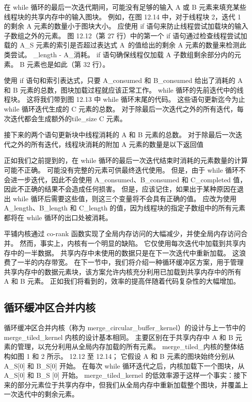 在 while 循环的最后一次迭代期间，可能没有足够的输入 $\mathrm{A}$ 或 B 元素来填充某些线程块的共享内存中的输入图块。 例如，在图 12.14 中，对于线程块 2，迭代 1 的剩余 A 元素的数量小于图块大小。 应使用 if 语句来防止线程尝试加载块的输入子数组之外的元素。 图 12.12（第 27 行）中的第一个 if 语句通过检查线程尝试加载的 A\_S 元素的索引是否超过表达式 A\ 的值给出的剩余 A 元素的数量来检测此类尝试。 \_length - A\_消耗。 if 语句确保线程仅加载 A 子数组剩余部分内的元素。 B 元素也是如此（第 32 行）。

使用 if 语句和索引表达式，只要 A\_consumed 和 B\_consumed 给出了消耗的 $\mathrm{A}$ 和 $\mathrm{B}$ 元素的总数，图块加载过程就应该正常工作。 while 循环的先前迭代中的线程块。 这将我们带到图 12.13 中 while 循环末尾的代码。 这些语句更新迄今为止 while 循环迭代生成的 $\mathrm{C}$ 元素的总数。 对于除最后一次迭代之外的所有迭代，每次迭代都会生成额外的tile\_size C 元素。

接下来的两个语句更新块中线程消耗的 A 和 B 元素的总数。 对于除最后一次迭代之外的所有迭代，线程块消耗的附加 A 元素的数量是以下返回值


正如我们之前提到的，在 while 循环的最后一次迭代结束时消耗的元素数量的计算可能不正确。 可能没有完整的元素可供最终迭代使用。 但是，由于 while 循环不会进一步迭代，因此不会使用 A\_consumed、B\_consumed 和 C\_completed 值，因此不正确的结果不会造成任何损害。 但是，应该记住，如果出于某种原因在退出 while 循环后需要这些值，则这三个变量将不会具有正确的值。 应改为使用 A\_length、B\_length 和 C\_length 的值，因为线程块的指定子数组中的所有元素都将在 while 循环的出口处被消耗。

平铺内核通过 co-rank 函数实现了全局内存访问的大幅减少，并使全局内存访问合并。 然而，事实上，内核有一个明显的缺陷。 它仅使用每次迭代中加载到共享内存中的一半数据。 共享内存中未使用的数据只是在下一次迭代中重新加载。 这浪费了一半的内存带宽。 在下一节中，我们将介绍一种循环缓冲区方案，用于管理共享内存中的数据元素块，该方案允许内核充分利用已加载到共享内存中的所有 A 和 B 元素。 正如我们将看到的，效率的提高伴随着代码复杂性的大幅增加。

\subsection{循环缓冲区合并内核}
循环缓冲区合并内核（称为 merge\_circular\_buffer\_kernel）的设计与上一节中的 merge\_tiled\_kernel 内核的设计基本相同。 主要区别在于共享内存中 $\mathrm{A}$ 和 $\mathrm{B}$ 元素的管理，以充分利用从全局内存加载的所有元素。 merge\_tiled\_内核的整体结构如图 1 和 2 所示。 12.12 至 12.14； 它假设 A 和 B 元素的图块始终分别从 A\_S[0] 和 B\_S[0] 开始。 在每次 while 循环迭代之后，内核加载下一个图块，从 A\_S[0] 和 B\_S [0] 开始。 merge\_tiled\_kernel 的低效率源于这样一个事实：接下来的部分元素位于共享内存中，但我们从全局内存中重新加载整个图块，并覆盖上一次迭代中的剩余元素。

